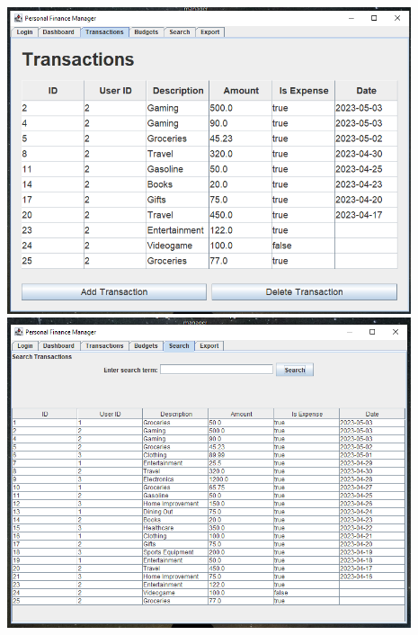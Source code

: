 \includegraphics[width=0.89\textwidth]{transactions.png} \\

\includegraphics[width=0.89\textwidth]{transactions_search.png}